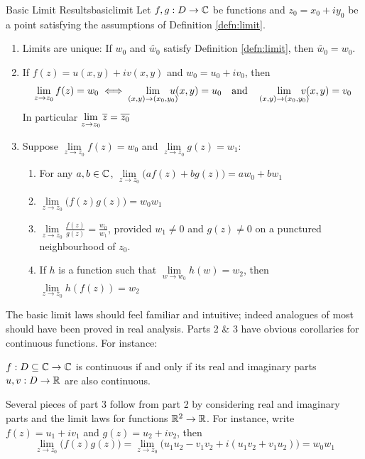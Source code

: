 \begin{thm}{Basic Limit Results}{basiclimit}
Let $f,g:D\to\mathbb{C}$ be functions and $z_0=x_0+iy_0$ be a point satisfying the assumptions of Definition \ref{defn:limit}.
\begin{enumerate}
  \item Limits are unique: If $w_0$ and $\widetilde{w_0}$ satisfy Definition \ref{defn:limit}, then $\widetilde{w_0}=w_0$.
  \item\label{thmbaslim2} If $f(z)=u(x,y)+iv(x,y)$ and $w_0=u_0+iv_0$, then
  \[
  	\lim_{z\to z_0}f(z)=w_0\iff \lim_{(x,y)\to (x_0,y_0)}\hspace*{-10pt} u(x,y)=u_0\quad \text{and}\quad \lim_{(x,y)\to (x_0,y_0)}\hspace*{-10pt} v(x,y)=v_0
  \]
  In particular $\lim\limits_{z\to z_0}\overline{z}=\overline{z_0}$
  \item Suppose $\lim\limits_{z\to z_0}f(z)=w_0$ and $\lim\limits_{z\to z_0}g(z)=w_1$:
  \begin{enumerate}
    \item For any $a,b\in\mathbb{C}$, $\lim\limits_{z\to z_0}\bigl( af(z)+bg(z)\bigr)=aw_0+bw_1$
    \item $\lim\limits_{z\to z_0}\bigl(f(z)g(z)\bigr)=w_0w_1$
    \item $\lim\limits_{z\to z_0}\frac{f(z)}{g(z)}=\frac{w_0}{w_1}$, provided $w_1\neq 0$ and $g(z)\neq 0$ on a punctured neighbourhood of $z_0$.
    \item If $h$ is a function such that $\lim\limits_{w\to w_0}h(w)=w_2$, then $\lim\limits_{z\to z_0}h(f(z))=w_2$
	\end{enumerate}
\end{enumerate}
\end{thm}

The basic limit laws should feel familiar and intuitive; indeed analogues of most should have been proved in real analysis. Parts 2 \& 3 have obvious corollaries for continuous functions. For instance:

\begin{cor}{}{}
	$f:D\subseteq\mathbb{C}\to\mathbb{C}$ is continuous if and only if its real and imaginary parts $u,v:D\to\mathbb{R}$ are also continuous. 
\end{cor}

Several pieces of part 3 follow from part 2 by considering real and imaginary parts and the limit laws for functions $\mathbb{R}^2\to\mathbb{R}$. For instance, write $f(z)=u_1+iv_1$ and $g(z)=u_2+iv_2$, then
\[
	\lim\limits_{z\to z_0}\bigl(f(z)g(z)\bigr) =\lim\limits_{z\to z_0}\bigl(u_1u_2-v_1v_2+i(u_1v_2+v_1u_2)\bigr) =w_0w_1
\]

